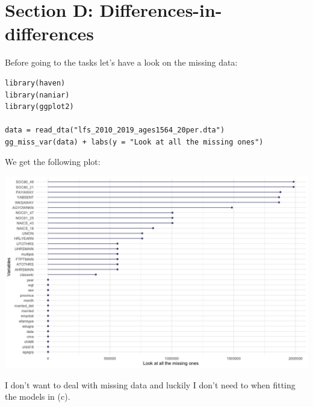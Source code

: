 \documentclass{article}
\begin{document}
	\section*{Section D: Differences-in-differences}
	Before going to the tasks let's have a look on the missing data:
	\begin{lstlisting}
library(haven)
library(naniar)
library(ggplot2)

data = read_dta("lfs_2010_2019_ages1564_20per.dta")
gg_miss_var(data) + labs(y = "Look at all the missing ones")
	\end{lstlisting}
	We get the following plot:
	\begin{center}
		\includegraphics[scale = 0.4]{missing_values}
	\end{center}
	I don't want to deal with missing data and luckily I don't need to when fitting the models in (c).
\end{document}
